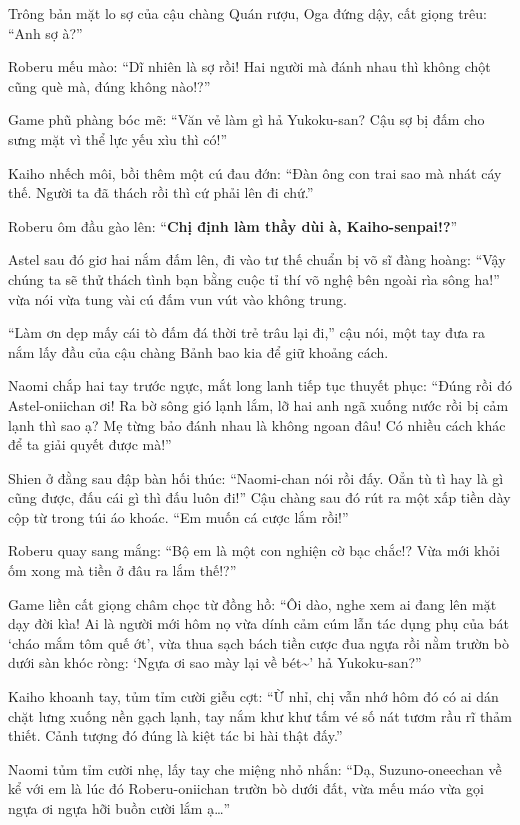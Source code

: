 \documentclass[../main.tex]{subfiles}
\begin{document}
Trông bản mặt lo sợ của cậu chàng Quán rượu, Oga đứng dậy, cất giọng trêu: ``Anh sợ à?''

Roberu mếu mào: ``Dĩ nhiên là sợ rồi! Hai người mà đánh nhau thì không chột cũng què mà, đúng không nào!?''

Game phũ phàng bóc mẽ: ``Văn vẻ làm gì hả Yukoku-san? Cậu sợ bị đấm cho sưng mặt vì thể lực yếu xìu thì có!''

Kaiho nhếch môi, bồi thêm một cú đau đớn: ``Đàn ông con trai sao mà nhát cáy thế. Người ta đã thách rồi thì cứ phải lên đi chứ.''

Roberu ôm đầu gào lên: ``\textbf{Chị định làm thầy dùi à, Kaiho-senpai!?}''

Astel sau đó giơ hai nắm đấm lên, đi vào tư thế chuẩn bị võ sĩ đàng hoàng: ``Vậy chúng ta sẽ thử thách tình bạn bằng cuộc tỉ thí võ nghệ bên ngoài rìa sông ha!'' vừa nói vừa tung vài cú đấm vun vút vào không trung.

``Làm ơn dẹp mấy cái tò đấm đá thời trẻ trâu lại đi,'' cậu nói, một tay đưa ra nắm lấy đầu của cậu chàng Bảnh bao kia để giữ khoảng cách.

Naomi chắp hai tay trước ngực, mắt long lanh tiếp tục thuyết phục: ``Đúng rồi đó Astel-oniichan ơi! Ra bờ sông gió lạnh lắm, lỡ hai anh ngã xuống nước rồi bị cảm lạnh thì sao ạ? Mẹ từng bảo đánh nhau là không ngoan đâu! Có nhiều cách khác để ta giải quyết được mà!''

Shien ở đằng sau đập bàn hối thúc: ``Naomi-chan nói rồi đấy. Oẳn tù tì hay là gì cũng được, đấu cái gì thì đấu luôn đi!'' Cậu chàng sau đó rút ra một xấp tiền dày cộp từ trong túi áo khoác. ``Em muốn cá cược lắm rồi!''


Roberu quay sang mắng: ``Bộ em là một con nghiện cờ bạc chắc!? Vừa mới khỏi ốm xong mà tiền ở đâu ra lắm thế!?''

Game liền cất giọng châm chọc từ đồng hồ: ``Ôi dào, nghe xem ai đang lên mặt dạy đời kìa! Ai là người mới hôm nọ vừa dính cảm cúm lẫn tác dụng phụ của bát `cháo mắm tôm quế ớt', vừa thua sạch bách tiền cược đua ngựa rồi nằm trườn bò dưới sàn khóc ròng: `Ngựa ơi sao mày lại về bét\~{}' hả Yukoku-san?''

Kaiho khoanh tay, tủm tỉm cười giễu cợt: ``Ừ nhỉ, chị vẫn nhớ hôm đó có ai dán chặt lưng xuống nền gạch lạnh, tay nắm khư khư tấm vé số nát tươm rầu rĩ thảm thiết. Cảnh tượng đó đúng là kiệt tác bi hài thật đấy.''

Naomi tủm tỉm cười nhẹ, lấy tay che miệng nhỏ nhắn: ``Dạ, Suzuno-oneechan về kể với em là lúc đó Roberu-oniichan trườn bò dưới đất, vừa mếu máo vừa gọi ngựa ơi ngựa hỡi buồn cười lắm ạ\dots''
\end{document}
